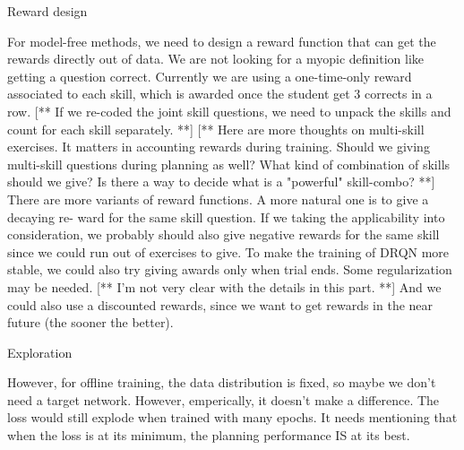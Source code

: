 Reward design

For model-free methods, we need to design a reward function that can get the rewards directly out of data. We are not looking for a myopic definition like getting a question correct. Currently we are using a one-time-only reward associated to each skill, which is awarded once the student get 3 corrects in a row. [** If we re-coded the joint skill questions, we need to unpack the skills and count for each skill separately. **]
[** Here are more thoughts on multi-skill exercises. It matters in accounting rewards during training. Should we giving multi-skill questions during planning as well? What kind of combination of skills should we give? Is there a way to decide what is a "powerful" skill-combo? **]
There are more variants of reward functions. A more natural one is to give a decaying re- ward for the same skill question. If we taking the applicability into consideration, we probably should also give negative rewards for the same skill since we could run out of exercises to give.
To make the training of DRQN more stable, we could also try giving awards only when trial ends. Some regularization may be needed. [** I’m not very clear with the details in this part. **]
And we could also use a discounted rewards, since we want to get rewards in the near future (the sooner the better).

Exploration

However, for offline training, the data distribution is fixed, so maybe we don’t need a target network. However, emperically, it doesn’t make a difference. The loss would still explode when trained with many epochs. It needs mentioning that when the loss is at its minimum, the planning performance IS at its best.

